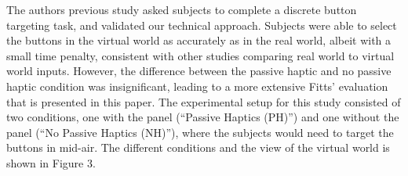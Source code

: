 \documentclass[]{aiaa-tc}%
\begin{document}
The authors previous study asked subjects to complete a discrete button targeting task, and validated our technical approach\cite{joyce_rapidly_2015}.
Subjects were able to select the buttons in the virtual world as accurately as in the real world, albeit with a small time penalty, consistent with other studies comparing real world to virtual world inputs\cite{liu_comparing_2009}.
However, the difference between the passive haptic and no passive haptic condition was insignificant, leading to a more extensive Fitts' evaluation that is presented in this paper.
The experimental setup for this study consisted of two conditions, one with the panel (``Passive Haptics (PH)'') and one without the panel (``No Passive Haptics (NH)''), where the subjects would need to target the buttons in mid-air.
The different conditions and the view of the virtual world is shown in Figure 3.
\end{document}
